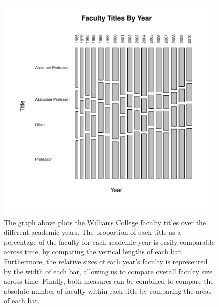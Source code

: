 \documentclass[a4paper]{report}
\begin{document}
\begin{article}
\begin{figure}
  \centering
  \vspace*{.1in}
\includegraphics{faculty-005}

\caption{
The graph above plots the Williams College faculty titles over the
different academic years. The proportion of each title as a percentage
of the faculty for each academic year is easily comparable across
time, by comparing the vertical lengths of each bar. Furthermore, the
relative sizes of each year's faculty is represented by the width of
each bar, allowing us to compare overall faculty size across
time. Finally, both measures can be combined to compare the absolute
number of faculty within each title by comparing the areas of each bar.
}
\end{figure}

\address{Andrew Leeser \\
  Kane Capital Management \\
  Cambridge, MA, USA\\
}



\end{article}
\end{document}
